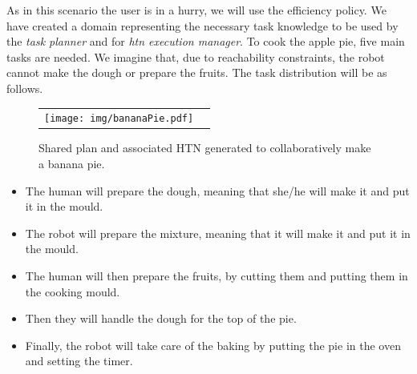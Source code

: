 As in this scenario the user is in a hurry, we will use the efficiency policy.
We have created a domain representing the necessary task knowledge to be used by the \textit{task planner} and for \textit{htn execution manager}.
To cook the apple pie, five main tasks are needed. We imagine that, due to reachability constraints, the robot cannot make the dough or prepare the fruits. The task distribution will be as follows.

\begin{figure}[ht!]

 \centering
 \begin{tabular}{cc}
  \texttt{[image: img/bananaPie.pdf]}
 \end{tabular}
   \vspace{-8pt}
 \caption{Shared plan and associated HTN generated to collaboratively make a banana pie.}
 \label{fig:bananaPlan}
   \vspace{-22pt}
 \end{figure}
 

\begin{itemize}
\item The human will prepare the dough, meaning that she/he will make it and put it in the mould.
\item The robot will prepare the mixture, meaning that it will make it and put it in the mould.
\item The human will then prepare the fruits, by cutting them and putting them in the cooking mould.
\item Then they will handle the dough for the top of the pie.
\item Finally, the robot will take care of the baking by putting the pie in the oven and setting the timer.
\end{itemize} 

